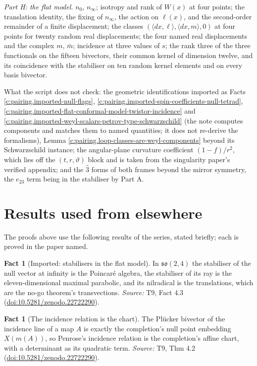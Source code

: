 \documentclass[11pt]{article}
\theoremstyle{definition}
\newtheorem{fact}[theorem]{Fact}
\theoremstyle{plain}
\providecommand{\mb}{}\renewcommand{\mb}{\bar m}
\providecommand{\ninf}{}\renewcommand{\ninf}{n_{\infty}}
\providecommand{\nz}{}\renewcommand{\nz}{n_{0}}
\providecommand{\ip}{}\renewcommand{\ip}[2]{\langle #1, #2\rangle}
\begin{document}
\emph{Part H: the flat model.} $\nz$, $\ninf$; isotropy and rank of $W(x)$ at four points; the translation identity, the fixing of $\ninf$, the action on $\ell(x)$, and the second-order remainder of a finite displacement; the classes $(\ip{dx}{\ell}, \ip{dx}{m}, 0)$ at four points for twenty random real displacements; the four named real displacements and the complex $m$, $\mb$; incidence at three values of $s$; the rank three of the three functionals on the fifteen bivectors, their common kernel of dimension twelve, and its coincidence with the stabiliser on ten random kernel elements and on every basis bivector.

What the script does not check: the geometric identifications imported as Facts \ref{c:pairing.imported-null-flags}, \ref{c:pairing.imported-spin-coefficients-null-tetrad}, \ref{c:pairing.imported-flat-conformal-model-twistor-incidence} and \ref{c:pairing.imported-weyl-scalars-petrov-type-schwarzschild} (the note computes components and matches them to named quantities; it does not re-derive the formalisms), Lemma \ref{c:pairing.loop-classes-are-weyl-components} beyond its Schwarzschild instance; the angular-plane curvature coefficient $(1 - f)/r^{2}$, which lies off the $(t, r, \vartheta)$ block and is taken from the singularity paper's verified appendix; and the $\hat3$ forms of both frames beyond the mirror symmetry, the $e_{23}$ term being in the stabiliser by Part A.

\section{Results used from elsewhere}
The proofs above use the following results of the series, stated briefly; each is proved in the paper named.

\begin{fact}[Imported: stabilisers in the flat model]\label{c:correspondence.imported-stabilisers-flat-model}
In $\mathfrak{so}(2,4)$ the stabiliser of the null vector at infinity is the Poincar\'e algebra, the stabiliser of its ray is the eleven-dimensional maximal parabolic, and its nilradical is the translations, which are the no-go theorem's transvections.
\emph{Source:} T9, Fact 4.3 (\href{https://doi.org/10.5281/zenodo.22722290}{doi:10.5281/zenodo.22722290}).
\end{fact}

\begin{fact}[The incidence relation is the chart]\label{c:correspondence.incidence-relation-chart}
The Pl\"ucker bivector of the incidence line of a map $A$ is exactly the completion's null point embedding $X(m(A))$, so Penrose's incidence relation is the completion's affine chart, with a determinant as its quadratic term.
\emph{Source:} T9, Thm 4.2 (\href{https://doi.org/10.5281/zenodo.22722290}{doi:10.5281/zenodo.22722290}).
\end{fact}
\end{document}
